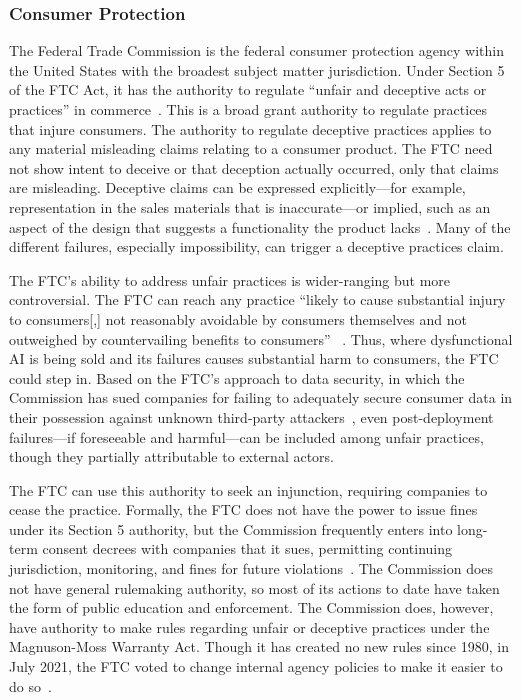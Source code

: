 \documentclass[acmconf,manuscript,screen,natbib=true]{acmart}
\begin{document}
\subsubsection{Consumer Protection}
The Federal Trade Commission is the federal consumer protection agency within the United States with the broadest subject matter jurisdiction. Under Section 5 of the FTC Act, it has the authority to regulate ``unfair and deceptive acts or practices'' in commerce~\cite{Section_5}. This is a  broad grant authority to regulate practices that injure consumers. The authority to regulate deceptive practices applies to any material misleading claims relating to a consumer product. The FTC need not show intent to deceive or that deception actually occurred, only that claims are misleading. Deceptive claims can be expressed explicitly---for example, representation in the sales materials that is inaccurate---or implied, such as an aspect of the design that suggests a functionality the product lacks~\cite{hoofnagle2016federal,hartzog2018privacy}. Many of the different failures, especially impossibility, can trigger a deceptive practices claim.

The FTC's ability to address unfair practices is wider-ranging but more controversial. The FTC can reach any practice ``likely to cause substantial injury to consumers[,] not reasonably avoidable by consumers themselves and not outweighed by countervailing benefits to consumers'' ~\cite{Section_5}. Thus, where dysfunctional AI is being sold and its failures causes substantial harm to consumers, the FTC could step in. Based on the FTC's approach to data security, in which the Commission has sued companies for failing to adequately secure consumer data in their possession against unknown third-party attackers~\cite{mcgeveran2018duty}, even post-deployment failures---if foreseeable and harmful---can be included among unfair practices, though they partially attributable to external actors.

The FTC can use this authority to seek an injunction, requiring companies to cease the practice. Formally, the FTC does not have the power to issue fines under its Section 5 authority, but the Commission frequently enters into long-term consent decrees with companies that it sues, permitting continuing jurisdiction, monitoring, and fines for future violations~\cite{FB_consent_decree, Snapchat_consent_decree}. The Commission does not have general rulemaking authority, so most of its actions to date have taken the form of public education and enforcement. The Commission does, however, have authority to make rules regarding unfair or deceptive practices under the Magnuson-Moss Warranty Act. Though it has created no new rules since 1980, in July 2021, the FTC voted to change internal agency policies to make it easier to do so~\cite{FTC_Mag_Moss}.
\end{document}
